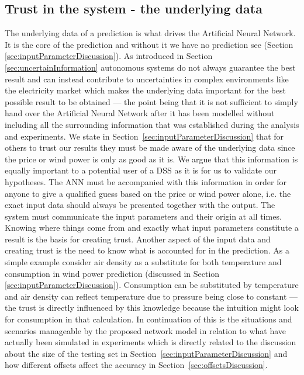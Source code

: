 \subsection{Trust in the system - the underlying data}
The underlying data of a prediction is what drives the Artificial Neural Network. It is the core of the prediction and without it we have no prediction see (Section \ref{sec:inputParameterDiscussion}). As introduced in Section \ref{sec:uncertainInformation} autonomous systems do not always guarantee the best result and can instead contribute to uncertainties in complex environments like the electricity market which makes the underlying data important for the best possible result to be obtained --- the point being that it is not sufficient to simply hand over the Artificial Neural Network after it has been modelled without including all the surrounding information that was established during the analysis and experiments. We state in Section~\ref{sec:inputParameterDiscussion} that for others to trust our results they must be made aware of the underlying data since the price or wind power is only as good as it is. We argue that this information is equally important to a potential user of a DSS as it is for us to validate our hypotheses. The ANN must be accompanied with this information in order for anyone to give a qualified guess based on the price or wind power alone, i.e. the exact input data should always be presented together with the output. The system must communicate the input parameters and their origin at all times. Knowing where things come from and exactly what input parameters constitute a result is the basis for creating trust. Another aspect of the input data and creating trust is the need to know what is accounted for in the prediction. As a simple example consider air density as a substitute for both temperature and consumption in wind power prediction (discussed in Section \ref{sec:inputParameterDiscussion}). Consumption can be substituted by temperature and air density can reflect temperature due to pressure being close to constant --- the trust is directly influenced by this knowledge because the intuition might look for consumption in that calculation. In continuation of this is the situations and scenarios manageable by the proposed network model in relation to what have actually been simulated in experiments which is directly related to the discussion about the size of the testing set in Section~\ref{sec:inputParameterDiscussion} and how different offsets affect the accuracy in Section~\ref{sec:offsetsDiscussion}. 
 
